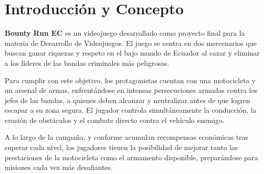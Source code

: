 \section{Introducción y Concepto}

\textbf{Bounty Run EC} es un videojuego desarrollado como proyecto final para la materia de Desarrollo de Videojuegos. El juego se centra en dos mercenarios que buscan ganar riquezas y respeto en el bajo mundo de Ecuador al cazar y eliminar a los líderes de las bandas criminales más peligrosas.

Para cumplir con este objetivo, los protagonistas cuentan con una motocicleta y un arsenal de armas, enfrentándose en intensas persecuciones armadas contra los jefes de las bandas, a quienes deben alcanzar y neutralizar antes de que logren escapar a su zona segura. El jugador controla simultáneamente la conducción, la evasión de obstáculos y el combate directo contra el vehículo enemigo.

A lo largo de la campaña, y conforme acumulan recompensas económicas tras superar cada nivel, los jugadores tienen la posibilidad de mejorar tanto las prestaciones de la motocicleta como el armamento disponible, preparándose para misiones cada vez más desafiantes.
